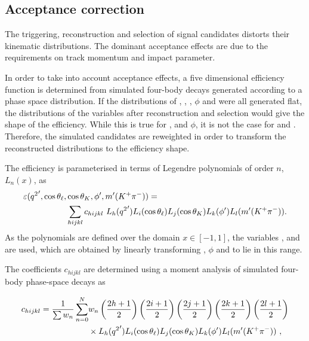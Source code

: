 \subsection{Acceptance correction}
\label{sec:kpimm:acceptance}

The triggering, reconstruction and selection of signal candidates distorts their kinematic distributions. The dominant acceptance effects are due to the requirements on track momentum and impact parameter.

In order to take into account acceptance effects, a five dimensional efficiency function is determined from simulated four-body \BdToKpimm decays generated according to a phase space distribution. If the distributions of \qsq, \ctl, \ctk, $\phi$ and \mkpi were all generated flat, the distributions of the variables after reconstruction and selection would give the shape of the efficiency.  While this is true for \ctl, \ctk and $\phi$, it is not the case for \qsq and \mkpi. Therefore, the simulated candidates are reweighted in order to transform the reconstructed distributions to the efficiency shape.

The efficiency is parameterised in terms of Legendre polynomials of order $n$, $L_n(x)$, as
\begin{equation}
\begin{split}
\varepsilon({q^2}',\cos{\theta_\ell},&\cos{\theta_K},\phi',m'({{K}^+}{{\pi}^-})) = \\
& \sum_{hijkl} c_{hijkl}~L_{h}({q^2}')L_{i}(\cos{\theta_\ell})L_{j}(\cos{\theta_K})L_{k}(\phi')L_{l}(m'({{K}^+}{{\pi}^-})).
 \end{split}
 \label{eqn:legendre}
\end{equation}
As the polynomials are defined over the domain $x\in[-1,1]$, the variables \qsqp, \phip and \mkpip are used, which are obtained by linearly transforming \qsq, $\phi$ and \mkpi to lie in this range.

The coefficients $c_{hijkl}$ are determined using a moment analysis of simulated four-body \BdToKpimm phase-space decays as

\begin{equation}
   \begin{split}
     c_{hijkl} = \frac{1}{\sum w_{n}}\sum_{n=0}^{N}&w_{n}\left(\frac{2h+1}{2}\right)\left(\frac{2i+1}{2}\right)\left(\frac{2j+1}{2}\right)\left(\frac{2k+1}{2}\right)\left(\frac{2l+1}{2}\right)\\
     &\times L_{h}({q^2}')L_{i}(\cos{\theta_\ell})L_{j}(\cos{\theta_K})L_{k}(\phi')L_{l}(m'({{K}^+}{{\pi}^-}))~,
     \end{split}
 \end{equation}

